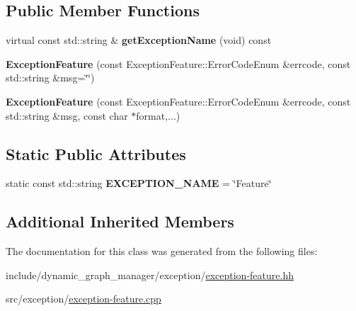 \subsection*{Public Member Functions}
\begin{DoxyCompactItemize}
\item 
virtual const std\+::string \& {\bfseries get\+Exception\+Name} (void) const \hypertarget{classdynamic__graph_1_1ExceptionFeature_aec48d79033199babc16d37048f61aba4}{}\label{classdynamic__graph_1_1ExceptionFeature_aec48d79033199babc16d37048f61aba4}

\item 
{\bfseries Exception\+Feature} (const Exception\+Feature\+::\+Error\+Code\+Enum \&errcode, const std\+::string \&msg=\char`\"{}\char`\"{})\hypertarget{classdynamic__graph_1_1ExceptionFeature_a76a3b0adc5f5881b8b3609ddf989f24a}{}\label{classdynamic__graph_1_1ExceptionFeature_a76a3b0adc5f5881b8b3609ddf989f24a}

\item 
{\bfseries Exception\+Feature} (const Exception\+Feature\+::\+Error\+Code\+Enum \&errcode, const std\+::string \&msg, const char $\ast$format,...)\hypertarget{classdynamic__graph_1_1ExceptionFeature_a88a704700091fa451ee9bc6db1ad793e}{}\label{classdynamic__graph_1_1ExceptionFeature_a88a704700091fa451ee9bc6db1ad793e}

\end{DoxyCompactItemize}
\subsection*{Static Public Attributes}
\begin{DoxyCompactItemize}
\item 
static const std\+::string {\bfseries E\+X\+C\+E\+P\+T\+I\+O\+N\+\_\+\+N\+A\+ME} = \char`\"{}Feature\char`\"{}\hypertarget{classdynamic__graph_1_1ExceptionFeature_a977865e1bf4940aed64bf434ec72bf18}{}\label{classdynamic__graph_1_1ExceptionFeature_a977865e1bf4940aed64bf434ec72bf18}

\end{DoxyCompactItemize}
\subsection*{Additional Inherited Members}


The documentation for this class was generated from the following files\+:\begin{DoxyCompactItemize}
\item 
include/dynamic\+\_\+graph\+\_\+manager/exception/\hyperlink{exception-feature_8hh}{exception-\/feature.\+hh}\item 
src/exception/\hyperlink{exception-feature_8cpp}{exception-\/feature.\+cpp}\end{DoxyCompactItemize}
